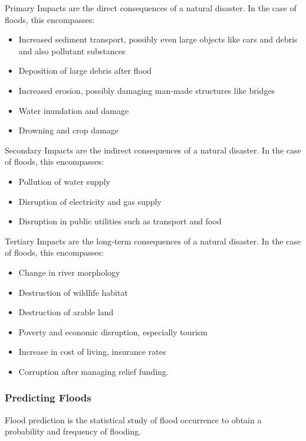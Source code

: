 \documentclass[../../main]{subfiles}
\begin{document}
	Primary Impacts are the direct consequences of a natural disaster. In the case of floods, this encompasses:

	\begin{itemize}
		\item Increased sediment transport, possibly even large objects like cars and debris and also pollutant substances
		\item Deposition of large debris after flood
		\item Increased erosion, possibly damaging man-made structures like bridges
		\item Water inundation and damage
		\item Drowning and crop damage
	\end{itemize}

	Secondary Impacts are the indirect consequences of a natural disaster. In the case of floods, this encompasses:

	\begin{itemize}
		\item Pollution of water supply
		\item Disruption of electricity and gas supply
		\item Disruption in public utilities such as transport and food
	\end{itemize}

	Tertiary Impacts are the long-term consequences of a natural disaster. In the case of floods, this encompasses:

	\begin{itemize}
		\item Change in river morphology
		\item Destruction of wildlife habitat
		\item Destruction of arable land
		\item Poverty and economic disruption, especially tourism
		\item Increase in cost of living, insurance rates
		\item Corruption after managing relief funding.
	\end{itemize}

\subsubsection{Predicting Floods}

	Flood prediction is the statistical study of flood occurrence to obtain a probability and frequency of flooding. \\
\end{document}
